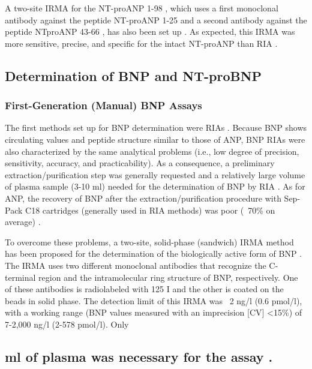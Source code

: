 \documentclass[14pt,a4paper,onecolumn]{extarticle}
\begin{document}
A two-site IRMA for the NT-proANP 1-98 , which uses a first monoclonal antibody
against the peptide NT-proANP 1-25 and a second antibody against the peptide NTproANP 43-66 , has also been set up \citep{bib247}. As expected, this IRMA was more sensitive, precise, and specific for the intact NT-proANP than RIA \citep{bib247}.

\subsection{ Determination of BNP and NT-proBNP}

\subsubsection{ First-Generation (Manual) BNP Assays}

The first methods set up for BNP determination were RIAs \citep{bib248} \citep{bib249} \citep{bib250} \citep{bib251} \citep{bib252} \citep{bib253} \citep{bib254} \citep{bib255}. Because BNP shows
circulating values and peptide structure similar to those of ANP, BNP RIAs were also
characterized by the same analytical problems (i.e., low degree of precision, sensitivity, accuracy, and practicability). As a consequence, a preliminary extraction/purification
step was generally requested and a relatively large volume of plasma sample (3-10 ml)
needed for the determination of BNP by RIA \citep{bib253}. As for ANP, the recovery of BNP after
the extraction/purification procedure with Sep-Pack C18 cartridges (generally used in
RIA methods) was poor (~70\% on average) \citep{bib250} \citep{bib253}.

To overcome these problems, a two-site, solid-phase (sandwich) IRMA method has
been proposed for the determination of the biologically active form of BNP \citep{bib213} \citep{bib256} \citep{bib257}.
The IRMA uses two different monoclonal antibodies that recognize the C-terminal
region and the intramolecular ring structure of BNP, respectively. One of these antibodies is radiolabeled with 125 I and the other is coated on the beads in solid phase. The
detection limit of this IRMA was ~2 ng/l (0.6 pmol/l), with a working range (BNP values measured with an imprecision [CV] <15\%) of 7-2,000 ng/l (2-578 pmol/l). Only
\subsection{ ml of plasma was necessary for the assay \citep{bib213} \citep{bib257}.}
\end{document}
